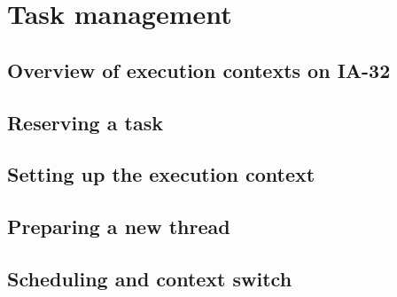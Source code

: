 
%
%

\chapter{Task management}

%
%

\section{Overview of execution contexts on IA-32}

%
%

\section{Reserving a task}

%
%

\section{Setting up the execution context}

%
%

\section{Preparing a new thread}

%
%

\section{Scheduling and context switch}
